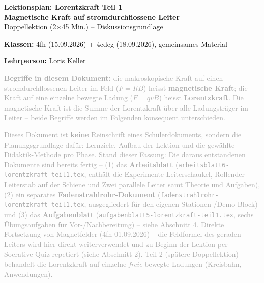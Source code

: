 \documentclass[11pt,a4paper]{article}
\begin{document}
\sloppy

\begin{center}
{\Huge\bfseries\color{titleblue}Lektionsplan: Lorentzkraft Teil 1}\\[0.2em]
{\Large\bfseries\color{titleblue}Magnetische Kraft auf stromdurchflossene Leiter}\\[0.4em]
{\large Doppellektion (2$\times$45 Min.) -- Diskussionsgrundlage}
\end{center}
\vspace{0.5em}

\noindent\textbf{Klassen:} 4fh (15.09.2026) + 4cdeg (18.09.2026), gemeinsames Material

\noindent\textbf{Lehrperson:} Loris Keller

\vspace{0.3em}
\noindent\textcolor{darkgray}{\textbf{Begriffe in diesem Dokument:} die
makroskopische Kraft auf einen stromdurchflossenen Leiter im Feld
($F=IlB$) heisst \textbf{magnetische Kraft}; die Kraft auf eine einzelne
bewegte Ladung ($F=qvB$) heisst \textbf{Lorentzkraft}. Die magnetische
Kraft ist die Summe der Lorentzkraft über alle Ladungsträger im Leiter --
beide Begriffe werden im Folgenden konsequent unterschieden.}

\vspace{0.3em}
\noindent\textcolor{darkgray}{Dieses Dokument ist \textbf{keine} Reinschrift eines Schülerdokuments, sondern die
Planungsgrundlage dafür: Lernziele, Aufbau der Lektion und die gewählte
Didaktik-Methode pro Phase. Stand dieser Fassung: Die daraus entstandenen
Dokumente sind bereits fertig -- (1) das \textbf{Arbeitsblatt}
(\texttt{arbeitsblatt6-lorentzkraft-teil1.tex}, enthält die Experimente
Leiterschaukel, Rollender Leiterstab auf der Schiene und Zwei parallele
Leiter samt Theorie und Aufgaben), (2) ein separates
\textbf{Fadenstrahlrohr-Dokument}
(\texttt{fadenstrahlrohr-lorentzkraft-teil1.tex}, ausgegliedert für den
eigenen Stationen-/Demo-Block) und (3) das \textbf{Aufgabenblatt}
(\texttt{aufgabenblatt5-lorentzkraft-teil1.tex}, sechs Übungsaufgaben für
Vor-/Nachbereitung) -- siehe Abschnitt 4. Direkte Fortsetzung von
Magnetfelder (4fh 01.09.2026) -- die Feldformel des geraden Leiters wird
hier direkt weiterverwendet und zu Beginn der Lektion per Socrative-Quiz
repetiert (siehe Abschnitt 2). Teil 2 (spätere Doppellektion) behandelt
die Lorentzkraft auf einzelne \emph{freie} bewegte Ladungen (Kreisbahn,
Anwendungen).}

\end{document}
